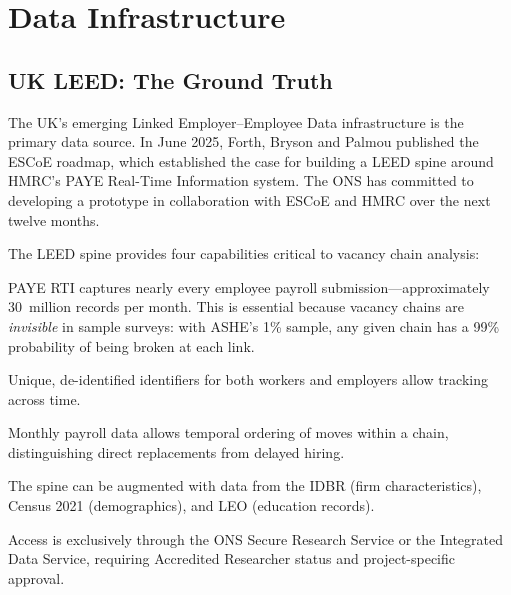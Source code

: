 \documentclass[a4paper]{tufte-handout}
\begin{document}
\section{Data Infrastructure}

\subsection{UK LEED: The Ground Truth}

The UK's emerging Linked Employer--Employee Data infrastructure is the primary
data source. In June 2025, Forth, Bryson and Palmou published the ESCoE
roadmap, which established the case for building a LEED spine around HMRC's
PAYE Real-Time Information system. The ONS has committed to developing a
prototype in collaboration with ESCoE and HMRC over the next twelve months.

The LEED spine provides four capabilities critical to vacancy chain analysis:

\begin{description}[style=nextline, font=\normalfont\itshape]
	\item[Universal coverage] PAYE RTI captures nearly every employee payroll
	      submission---approximately 30~million records per month. This is essential
	      because vacancy chains are \emph{invisible} in sample surveys: with ASHE's
	      1\% sample, any given chain has a 99\% probability of being broken at each
	      link.

	\item[Longitudinal consistency] Unique, de-identified identifiers for both
	      workers and employers allow tracking across time.

	\item[High frequency] Monthly payroll data allows temporal ordering of moves
	      within a chain, distinguishing direct replacements from delayed hiring.

	\item[Linkability] The spine can be augmented with data from the IDBR (firm
	      characteristics), Census 2021 (demographics), and LEO (education records).
\end{description}

\noindent
Access is exclusively through the ONS Secure Research Service or the Integrated
Data Service, requiring Accredited Researcher status and project-specific
approval.
\end{document}

